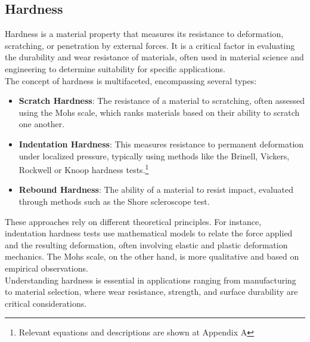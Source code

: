 \documentclass{article}
\begin{document}
       \subsection{Hardness}\label{hardnesstypes}
    Hardness is a material property that measures its resistance to deformation, scratching, or penetration by external forces. It is a critical factor in evaluating the durability and wear resistance of materials, often used in material science and engineering to determine suitability for specific applications.\\[8pt]
    The concept of hardness is multifaceted, encompassing several types:
    \begin{itemize}
        \item \textbf{Scratch Hardness}: The resistance of a material to scratching, often assessed using the Mohs scale, which ranks materials based on their ability to scratch one another.
        \item \textbf{Indentation Hardness}: This measures resistance to permanent deformation under localized pressure, typically using methods like the Brinell, Vickers, Rockwell or Knoop hardness tests.\footnote{Relevant equations and descriptions are shown at Appendix A}
        \item \textbf{Rebound Hardness}: The ability of a material to resist impact, evaluated through methods such as the Shore scleroscope test.
    \end{itemize}
    These approaches rely on different theoretical principles. For instance, indentation hardness tests use mathematical models to relate the force applied and the resulting deformation, often involving elastic and plastic deformation mechanics. The Mohs scale, on the other hand, is more qualitative and based on empirical observations.\\[8pt]
    Understanding hardness is essential in applications ranging from manufacturing to material selection, where wear resistance, strength, and surface durability are critical considerations.
\end{document}
